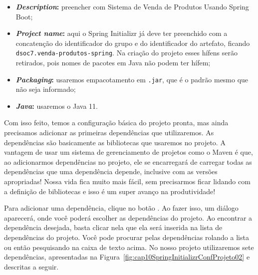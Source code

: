 \begin{itemize}
\begin{itemize}
        \item \textbf{\textit{Description}:} preencher com Sistema de Venda de Produtos Usando Spring Boot;
        
        \item \textbf{\textit{Project name}:} aqui o Spring Initializr já deve ter preenchido com a concatenção do identificador do grupo e do identificador do artefato, ficando \texttt{dsoc7.venda-produtos-spring}. Na criação do projeto esses hífens serão retirados, pois nomes de pacotes em Java não podem ter hífem;
        
        \item \textbf{\textit{Packaging}:} usaremos empacotamento em \texttt{.jar}, que é o padrão mesmo que não seja informado;
        
        \item \textbf{\textit{Java}:} usaremos o Java 11.
        
    \end{itemize}
\end{itemize}

Com isso feito, temos a configuração básica do projeto pronta, mas ainda precisamos adicionar as primeiras dependências que utilizaremos. As dependências são basicamente as bibliotecas que usaremos no projeto. A vantagem de usar um sistema de gerenciamento de projetos como o Maven é que, ao adicionarmos dependências no projeto, ele se encarregará de carregar todas as dependências que uma dependência depende, inclusive com as versões apropriadas! Nossa vida fica muito mais fácil, sem precisarmos ficar lidando com a definição de bibliotecas e isso é um super avanço na produtividade!

Para adicionar uma dependência, clique no botão . Ao fazer isso, um diálogo aparecerá, onde você poderá escolher as dependências do projeto. Ao encontrar a dependência desejada, basta clicar nela que ela será inserida na lista de dependências do projeto. Você pode procurar pelas dependências rolando a lista ou então pesquisando na caixa de texto acima. No nosso projeto utilizaremos sete dependências, apresentadas na Figura~\ref{fig:cap10SpringInitializrConfProjeto02} e descritas a seguir.

